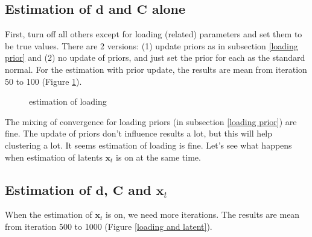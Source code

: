 \documentclass[]{article}
\begin{document}
\subsection{Estimation of \(\mathbf{d}\) and \(\mathbf{C}\) alone}
First, turn off all others except for loading (related) parameters and set them to be true values. There are 2 versions: (1) update priors as in subsection \ref{loading prior} and (2) no update of priors, and just set the prior for each as the standard normal.
For the estimation with prior update, the results are mean from iteration 50 to 100 (Figure \ref{loading alone}).
\begin{figure}[h!]
	\caption{estimation of loading}
	\label{loading alone}
\end{figure}

The mixing of convergence for loading priors (in subsection \ref{loading prior}) are fine. The update of priors don't influence results a lot, but this will help clustering a lot. It seems estimation of loading is fine. Let's see what happens when estimation of latents \(\mathbf{x}_t\) is on at the same time.

\subsection{Estimation of \(\mathbf{d}\), \(\mathbf{C}\) and \(\mathbf{x}_{t}\)}
When the estimation of \(\mathbf{x}_t\) is on, we need more iterations. The results are mean from iteration 500 to 1000 (Figure \ref{loading and latent}).
\end{document}
